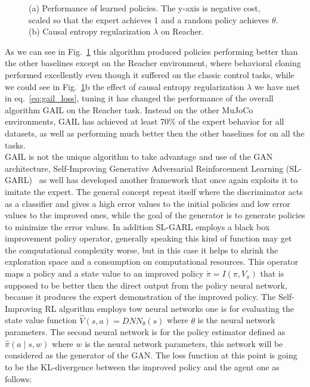 \begin{figure}
	\centerline
	\GAILExperiments
	\caption{(a) Performance of learned policies. The y-axis is negative cost, scaled so that the expert achieves 1 and a random policy achieves $\theta$. (b) Causal entropy regularization $\lambda$ on Reacher.}
	\label{fig:GAILExperiments}
\end{figure}
As we can see in Fig.~\ref{fig:GAILExperiments} this algorithm produced policies performing better than the other baselines except on the Reacher environment, where behavioral cloning performed excellently even though it suffered on the classic control tasks, while we could see in Fig.~\ref{fig:GAILExperiments}b the effect of causal entropy regularization $\lambda$ we have met in eq.~\ref{eq:gail_loss}, tuning it has changed the performance of the overall algorithm GAIL on the Reacher task. Instead on the other MuJoCo environments, GAIL has achieved at least $70\%$ of the expert behavior for all datasets, as well as performing much better then the other baselines for on all the tasks.\\
GAIL is not the unique algorithm to take advantage and use of the GAN architecture, Self-Improving Generative Adversarial Reinforcement Learning (SL-GARL)~\cite{liu2019self} as well has developed another framework that once again exploits it to imitate the expert. The general concept repeat itself where the discriminator acts as a classifier and gives a high error values to the initial policies and low error values to the improved ones, while the goal of the generator is to generate policies to minimize the error values. In addition SL-GARL employs a black box improvement policy operator, generally speaking this kind of function may get the computational complexity worse, but in this case it helps to shrink the exploration space and a consumption on computational resources. This operator maps a policy and a state value to an improved policy $ \acute{\pi} = I(\pi, V_\pi)$ that is supposed to be better then the direct output from the policy neural network, because it produces the expert demonstration of the improved policy. The Self-Improving RL algorithm employs tow neural networks one is for evaluating the state value function  $\hat{V}(s,a)=DNN_\theta(s)$ where $\theta$ is the neural network parameters. The second neural network is for the policy estimator defined as $\hat{\pi}(a \mid s,w)$ where $w$ is the neural network parameters, this network will be considered as the generator of the GAN. The loss function at this point is going to be the KL-divergence between the improved policy and the agent one as follows:
